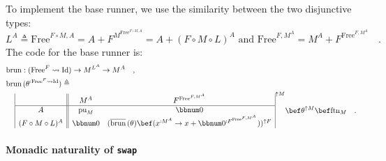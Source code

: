 To implement the base runner, we use the similarity between the two
disjunctive types:
\[
L^{A}\triangleq\text{Free}^{F\circ M,A}=A+F^{M^{\text{Free}^{F\circ M,A}}}=A+(F\circ M\circ L)^{A}\text{ and }\text{Free}^{F,M^{A}}=M^{A}+F^{\text{Free}^{F,M^{A}}}\quad.
\]
 The code for the base runner is:
\begin{align*}
 & \text{brun}:(\text{Free}^{F}\leadsto\text{Id})\rightarrow M^{L^{A}}\rightarrow M^{A}\quad,\\
 & \text{brun}\,(\theta^{:\text{Free}^{F}\leadsto\text{Id}})\triangleq\\
 & \quad\,\begin{array}{|c||cc|}
 & M^{A} & F^{\text{Free}^{F,M^{A}}}\\
\hline A & \text{pu}_{M} & \bbnum 0\\
(F\circ M\circ L)^{A} & \bbnum 0 & (\overline{\text{brun}}\,(\theta)\bef(x^{:M^{A}}\rightarrow x+\bbnum 0^{:F^{\text{Free}^{F,M^{A}}}}))^{\uparrow F}
\end{array}^{\uparrow M}\bef\theta^{\uparrow M}\bef\text{ftn}_{M}\quad.
\end{align*}


\paragraph{Monadic naturality of \texttt{swap}}

